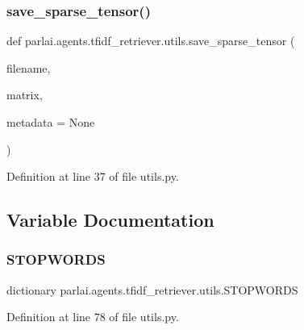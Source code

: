 \subsubsection{\texorpdfstring{save\+\_\+sparse\+\_\+tensor()}{save\_sparse\_tensor()}}
{\footnotesize\ttfamily def parlai.\+agents.\+tfidf\+\_\+retriever.\+utils.\+save\+\_\+sparse\+\_\+tensor (\begin{DoxyParamCaption}\item[{}]{filename,  }\item[{}]{matrix,  }\item[{}]{metadata = {\ttfamily None} }\end{DoxyParamCaption})}



Definition at line 37 of file utils.\+py.



\subsection{Variable Documentation}
\mbox{\label{namespaceparlai_1_1agents_1_1tfidf__retriever_1_1utils_afd1296771f9d4fe64b901825a37b1438}} 
\subsubsection{\texorpdfstring{S\+T\+O\+P\+W\+O\+R\+DS}{STOPWORDS}}
{\footnotesize\ttfamily dictionary parlai.\+agents.\+tfidf\+\_\+retriever.\+utils.\+S\+T\+O\+P\+W\+O\+R\+DS}



Definition at line 78 of file utils.\+py.

